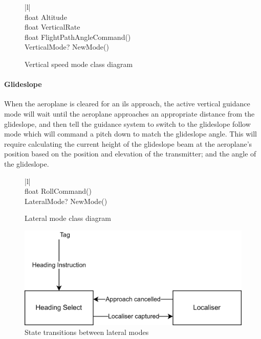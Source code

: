 \documentclass{article}
\begin{document}
\begin{figure}[H]
\centering
\begin{tabular}{ |l| } 
\hline
{} \\
\hline
float Altitude \\
float VerticalRate \\
\hline
float FlightPathAngleCommand() \\
VerticalMode? NewMode() \\
\hline
\end{tabular}
\caption{\label{fig:verticalspeedmodeclass}Vertical speed mode class diagram}
\end{figure}

\paragraph{Glideslope}
When the aeroplane is cleared for an \acrshort{ils} approach, the active vertical guidance mode will wait until the aeroplane approaches an appropriate distance from the glideslope, and then tell the guidance system to switch to the glideslope follow mode which will command a pitch down to match the glideslope angle.
This will require calculating the current height of the glideslope beam at the aeroplane's position based on the position and elevation of the transmitter; and the angle of the glideslope.

\begin{figure}[H]
\centering
\begin{tabular}{ |l| } 
\hline
{} \\
\hline
float RollCommand() \\
LateralMode? NewMode() \\
\hline
\end{tabular}
\caption{\label{fig:lateralmodeclass}Lateral mode class diagram}
\end{figure}

\begin{figure}[H]
\centering
\includegraphics{diagrams/lnav.png}
\caption{\label{fig:lnav}State transitions between lateral modes}
\end{figure}
\end{document}
